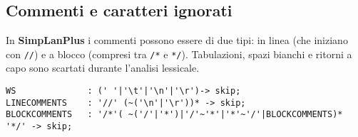 \documentclass[../../main]{subfiles}
\begin{document}
\subsection{Commenti e caratteri ignorati}
In \textbf{SimpLanPlus} i commenti possono essere di due tipi: 
in linea (che iniziano con \verb|//|) e a blocco (compresi tra \verb|/*| e \verb|*/|). Tabulazioni, spazi bianchi 
e ritorni a capo sono scartati durante l'analisi lessicale.
\begin{lstlisting}[style=antlr]
WS              : (' '|'\t'|'\n'|'\r')-> skip;
LINECOMMENTS 	: '//' (~('\n'|'\r'))* -> skip;
BLOCKCOMMENTS   : '/*'( ~('/'|'*')|'/'~'*'|'*'~'/'|BLOCKCOMMENTS)* '*/' -> skip;
\end{lstlisting}
\end{document}
